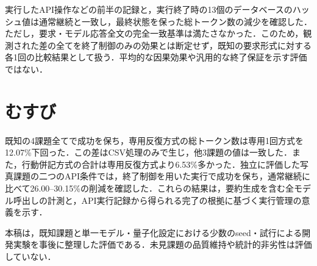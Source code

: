 \documentclass[letter]{ieicej}
\begin{document}
\TerminationResultsTable

\par\noindent\begin{minipage}{\columnwidth}
実行したAPI操作などの前半の記録と，実行終了時の13個のデータベースのハッシュ値は通常継続と一致し，最終状態を保った総トークン数の減少を確認した．ただし，要求・モデル応答全文の完全一致基準は満たさなかった．このため，観測された差の全てを終了制御のみの効果とは断定せず，既知の要求形式に対する各1回の比較結果として扱う．平均的な因果効果や汎用的な終了保証を示す評価ではない．
\end{minipage}\par{}

\section{むすび}

既知の4課題全てで成功を保ち，専用反復方式の総トークン数は専用1回方式を12.07\%下回った．この差はCSV処理のみで生じ，他3課題の値は一致した．また，行動併記方式の合計は専用反復方式より6.53\%多かった．独立に評価した写真課題の二つのAPI条件では，終了制御を用いた実行で成功を保ち，通常継続に比べて26.00--30.15\%の削減を確認した．これらの結果は，要約生成を含む全モデル呼出しの計測と，API実行記録から得られる完了の根拠に基づく実行管理の意義を示す．

本稿は，既知課題と単一モデル・量子化設定における少数のseed・試行による開発実験を事後に整理した評価である．未見課題の品質維持や統計的非劣性は評価していない．


\end{document}

